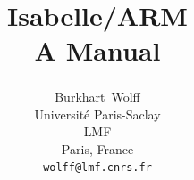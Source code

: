 \documentclass[abstract=on,fontsize=10pt,a4paper,mpinclude=true,
oneside,
pagesize,DIV=14]{scrartcl}
\title{Isabelle/ARM\\[.3em]\large A Manual}
\author{
Burkhart~Wolff\textsuperscript{\orcidlink{0000-0002-9648-7663}}\\\small
Universit\'e Paris-Saclay\\
LMF\\
Paris, France\\
\texttt{wolff@lmf.cnrs.fr}
}
\date{}
\begin{document}
\renewcommand{\sectionautorefname}{Section}
\renewcommand{\subsectionautorefname}{Section}
\renewcommand{\subsubsectionautorefname}{Section}

\maketitle



\printbibliography
\end{document}
